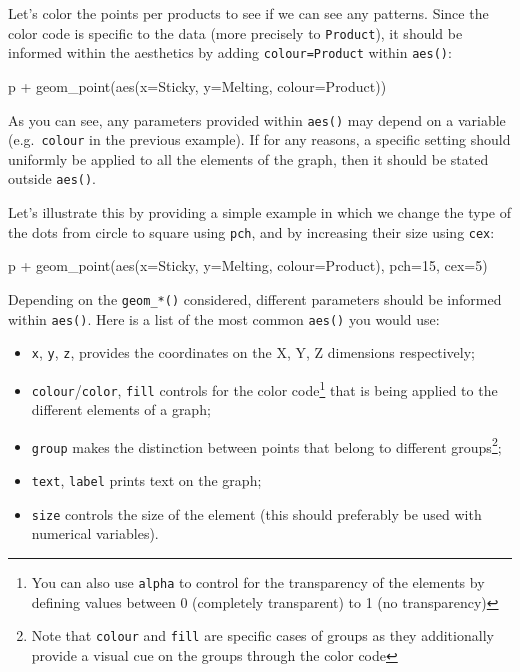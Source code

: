 \documentclass[
]{book}
\newenvironment{Shaded}{\begin{snugshade}}{\end{snugshade}}
\newcommand{\AttributeTok}[1]{\textcolor[rgb]{0.77,0.63,0.00}{#1}}
\newcommand{\DecValTok}[1]{\textcolor[rgb]{0.00,0.00,0.81}{#1}}
\newcommand{\FunctionTok}[1]{\textcolor[rgb]{0.00,0.00,0.00}{#1}}
\newcommand{\NormalTok}[1]{#1}
\newcommand{\SpecialCharTok}[1]{\textcolor[rgb]{0.00,0.00,0.00}{#1}}
\providecommand{\tightlist}{%
  \setlength{\itemsep}{0pt}\setlength{\parskip}{0pt}}
\begin{document}
Let's color the points per products to see if we can see any patterns. Since the color code is specific to the data (more precisely to \texttt{Product}), it should be informed within the aesthetics by adding \texttt{colour=Product} within \texttt{aes()}:

\begin{Shaded}
\begin{Highlighting}[]
\NormalTok{p }\SpecialCharTok{+} \FunctionTok{geom\_point}\NormalTok{(}\FunctionTok{aes}\NormalTok{(}\AttributeTok{x=}\NormalTok{Sticky, }\AttributeTok{y=}\NormalTok{Melting, }\AttributeTok{colour=}\NormalTok{Product))}
\end{Highlighting}
\end{Shaded}

As you can see, any parameters provided within \texttt{aes()} may depend on a variable (e.g.~\texttt{colour} in the previous example).
If for any reasons, a specific setting should uniformly be applied to all the elements of the graph, then it should be stated outside \texttt{aes()}.

Let's illustrate this by providing a simple example in which we change the type of the dots from circle to square using \texttt{pch}, and by increasing their size using \texttt{cex}:

\begin{Shaded}
\begin{Highlighting}[]
\NormalTok{p }\SpecialCharTok{+} \FunctionTok{geom\_point}\NormalTok{(}\FunctionTok{aes}\NormalTok{(}\AttributeTok{x=}\NormalTok{Sticky, }\AttributeTok{y=}\NormalTok{Melting, }\AttributeTok{colour=}\NormalTok{Product), }\AttributeTok{pch=}\DecValTok{15}\NormalTok{, }\AttributeTok{cex=}\DecValTok{5}\NormalTok{)}
\end{Highlighting}
\end{Shaded}

Depending on the \texttt{geom\_*()} considered, different parameters should be informed within \texttt{aes()}. Here is a list of the most common \texttt{aes()} you would use:

\begin{itemize}
\tightlist
\item
  \texttt{x}, \texttt{y}, \texttt{z}, provides the coordinates on the X, Y, Z dimensions respectively;
\item
  \texttt{colour}/\texttt{color}, \texttt{fill} controls for the color code\footnote{You can also use \texttt{alpha} to control for the transparency of the elements by defining values between 0 (completely transparent) to 1 (no transparency)} that is being applied to the different elements of a graph;
\item
  \texttt{group} makes the distinction between points that belong to different groups\footnote{Note that \texttt{colour} and \texttt{fill} are specific cases of groups as they additionally provide a visual cue on the groups through the color code};
\item
  \texttt{text}, \texttt{label} prints text on the graph;
\item
  \texttt{size} controls the size of the element (this should preferably be used with numerical variables).
\end{itemize}
\end{document}
